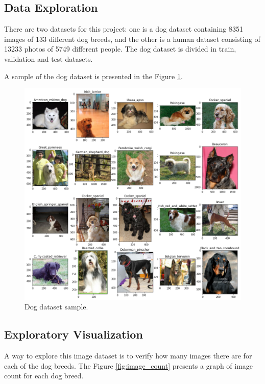 \documentclass{article}
\begin{document}
    \subsection{Data Exploration}

    There are two datasets for this project: one is a dog dataset containing 8351 images of 133 different dog breeds, and the other is a human dataset consisting of 13233 photos of 5749 different people. The dog dataset is divided in train, validation and test datasets.

    A sample of the dog dataset is presented in the Figure \ref*{fig:dog_sample}.

    \begin{figure}[htbp]
        \centering
        \includegraphics[width=\linewidth]{img/sample.png}
        \caption{Dog dataset sample.}
        \label{fig:dog_sample}
    \end{figure}

    \subsection{Exploratory Visualization}

    A way to explore this image dataset is to verify how many images there are for each of the dog breeds. The Figure \ref*{fig:image_count} presents a graph of image count for each dog breed.
\end{document}

